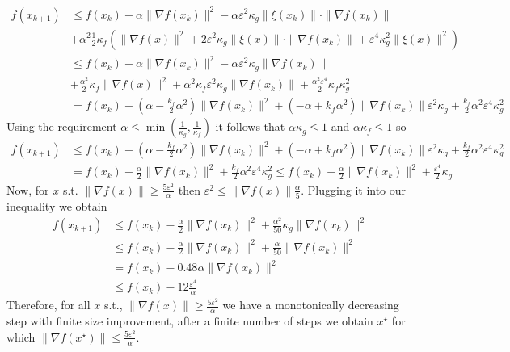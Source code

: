 \begin{equation}
\begin{aligned}
    f(x_{k+1}) & \leq f(x_k) - \alpha \|\nabla f(x_k)\|^2 - \alpha \varepsilon^2 \kappa_g \|\xi(x_k)\|\cdot\|\nabla f(x_k)\| \\& + \alpha^2 \frac{1}{2}\kappa_f\left(\|\nabla f(x)\|^2 + 2 \varepsilon^2 \kappa_g \|\xi(x)\|\cdot\|\nabla f(x_k)\| + \varepsilon^4 \kappa_g^2 \|\xi(x)\|^2 \right) \\ 
    & \leq f(x_k) - \alpha \|\nabla f(x_k)\|^2 - \alpha \varepsilon^2 \kappa_g \|\nabla f(x_k)\|  \\& +  \frac{\alpha^2}{2}\kappa_f \|\nabla f(x)\|^2 + \alpha^2 \kappa_f \varepsilon^2 \kappa_g \|\nabla f(x_k)\| +  \frac{\alpha^2 \varepsilon^4}{2} \kappa_f  \kappa_g^2 \\
    & = f(x_k) - (\alpha - \frac{k_f}{2}\alpha^2)\|\nabla{f(x_k)}\|^2 + (-\alpha + k_f \alpha^2)\|\nabla{f(x_k)}\| \varepsilon^2 \kappa_g  + \frac{k_f}{2}\alpha^2 \varepsilon^4 \kappa_g^2
\end{aligned}
\end{equation}
Using the requirement  $\alpha \leq \min(\frac{1}{\kappa_g}, \frac{1}{\kappa_f})$ it follows that $\alpha \kappa_g \leq 1$ and $\alpha \kappa_f \leq 1$ so
\begin{equation}
\begin{aligned}
    f(x_{k+1}) &\leq f(x_k) - (\alpha - \frac{k_f}{2}\alpha^2)\|\nabla{f(x_k)}\|^2 + (-\alpha + k_f \alpha^2)\|\nabla{f(x_k)}\| \varepsilon^2 \kappa_g  + \frac{k_f}{2}\alpha^2 \varepsilon^4 \kappa_g^2 \\
    & = f(x_k) - \frac{\alpha}{2}\|\nabla{f(x_k)}\|^2 + \frac{k_f}{2}\alpha^2 \varepsilon^4 \kappa_g^2 \leq f(x_k) - \frac{\alpha}{2}\|\nabla{f(x_k)}\|^2 + \frac{\varepsilon^4}{2} \kappa_g
    \end{aligned}
\end{equation}
Now, for $x$ s.t. $\|\nabla f(x)\| \geq \frac{5\varepsilon^2}{\alpha}$ then $\varepsilon^2 \leq \|\nabla f(x)\|\tfrac{\alpha}{5}$. Plugging it into our inequality we obtain
\begin{equation}
\begin{aligned}
    f(x_{k+1})  & \leq f(x_k) -  \frac{\alpha}{2} \|\nabla f(x_k)\|^2 + \frac{\alpha^2}{50}\kappa_g \|\nabla f(x_k)\|^2 \\
    & \leq f(x_k) -  \frac{\alpha}{2} \|\nabla f(x_k)\|^2 + \frac{\alpha}{50}\|\nabla f(x_k)\|^2 \\
    & = f(x_k) -  0.48 \alpha \|\nabla f(x_k)\|^2 \\
    & \leq f(x_k) -  12 \frac{\varepsilon^4}{\alpha}
    \end{aligned}
\end{equation}
Therefore, for all $x$ s.t., $\|\nabla f(x)\| \geq \frac{5\varepsilon^2}{\alpha}$ we have a monotonically decreasing step with finite size improvement, after a finite number of steps we obtain $x^{\star}$ for which $\|\nabla f(x^{\star})\| \leq \frac{5\varepsilon^2}{\alpha}$.

